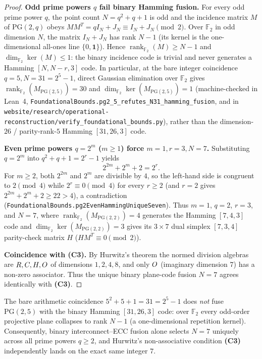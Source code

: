 \begin{proof}
\textbf{Odd prime powers $q$ fail binary Hamming fusion.}
For every odd prime power $q$, the point count $N=q^2+q+1$ is odd and the
incidence matrix $M$ of $\mathrm{PG}(2,q)$ obeys $MM^T = q I_N + J_N \equiv
I_N + J_N \pmod 2$. Over $\mathbb{F}_2$ in odd dimension $N$, the matrix
$I_N+J_N$ has rank $N-1$ (its kernel is the one-dimensional all-ones line
$\{0, \mathbf{1}\}$). Hence $\operatorname{rank}_{\mathbb{F}_2}(M)\ge N-1$
and $\dim_{\mathbb{F}_2}\ker(M)\le 1$: the binary incidence code is trivial
and never generates a Hamming $[N, N-r, 3]$ code. In particular, at the bare
integer coincidence $q=5, N=31=2^5-1$, direct Gaussian elimination over
$\mathbb{F}_2$ gives $\operatorname{rank}_{\mathbb{F}_2}(M_{\mathrm{PG}(2,5)})=30$
and $\dim_{\mathbb{F}_2}\ker(M_{\mathrm{PG}(2,5)})=1$ (machine-checked in
Lean~4, \texttt{FoundationalBounds.pg2\_5\_refutes\_N31\_hamming\_fusion}, and
in \texttt{website/research/operational-reconstruction/verify\_foundational\_bounds.py}),
rather than the dimension-$26$ / parity-rank-$5$ Hamming $[31,26,3]$ code.

\textbf{Even prime powers $q=2^m$ ($m\ge 1$) force $m=1, r=3, N=7$.}
Substituting $q=2^m$ into $q^2+q+1=2^r-1$ yields
\[
2^{2m}+2^m+2 = 2^r.
\]
For $m\ge 2$, both $2^{2m}$ and $2^m$ are divisible by $4$, so the left-hand
side is congruent to $2\pmod 4$ while $2^r\equiv 0\pmod 4$ for every $r\ge 2$
(and $r=2$ gives $2^{2m}+2^m+2\ge 22 > 4$), a contradiction
(\texttt{FoundationalBounds.pg2EvenHammingUniqueSeven}). Thus $m=1$, $q=2$,
$r=3$, and $N=7$, where $\operatorname{rank}_{\mathbb{F}_2}(M_{\mathrm{PG}(2,2)})=4$
generates the Hamming $[7,4,3]$ code and $\dim_{\mathbb{F}_2}\ker(M_{\mathrm{PG}(2,2)})=3$
gives its $3\times 7$ dual simplex $[7,3,4]$ parity-check matrix $H$ ($HM^T\equiv 0\pmod 2$).

\textbf{Coincidence with (C3).} By Hurwitz's theorem the normed division
algebras are $R,C,H,O$ of dimensions $1,2,4,8$,
and only $O$ (imaginary dimension $7$) has a non-zero associator. Thus the
unique binary plane-code fusion $N=7$ agrees identically with \textbf{(C3)}.
\end{proof}

\begin{remark}[No tie-break needed at $N=31$]
The bare arithmetic coincidence $5^2+5+1=31=2^5-1$ does \emph{not} fuse
$\mathrm{PG}(2,5)$ with the binary Hamming $[31,26,3]$ code: over $\mathbb{F}_2$
every odd-order projective plane collapses to rank $N-1$ (a one-dimensional
repetition kernel). Consequently, binary interconnect--ECC fusion alone selects
$N=7$ uniquely across all prime powers $q\ge 2$, and Hurwitz's non-associative
condition \textbf{(C3)} independently lands on the exact same integer $7$.
\end{remark}

